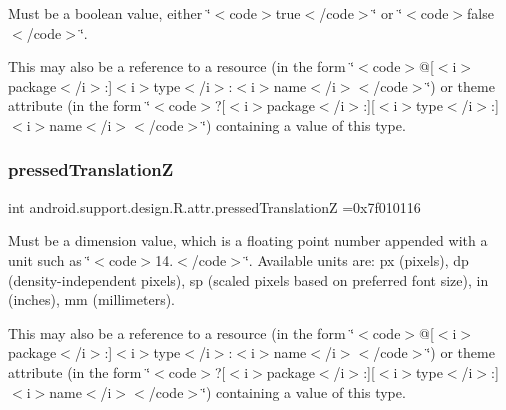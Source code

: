 Must be a boolean value, either \char`\"{}$<$code$>$true$<$/code$>$\char`\"{} or \char`\"{}$<$code$>$false$<$/code$>$\char`\"{}. 

This may also be a reference to a resource (in the form \char`\"{}$<$code$>$@\mbox{[}$<$i$>$package$<$/i$>$\+:\mbox{]}$<$i$>$type$<$/i$>$\+:$<$i$>$name$<$/i$>$$<$/code$>$\char`\"{}) or theme attribute (in the form \char`\"{}$<$code$>$?\mbox{[}$<$i$>$package$<$/i$>$\+:\mbox{]}\mbox{[}$<$i$>$type$<$/i$>$\+:\mbox{]}$<$i$>$name$<$/i$>$$<$/code$>$\char`\"{}) containing a value of this type. \mbox{\label{classandroid_1_1support_1_1design_1_1R_1_1attr_a04a96d87b401abecc5a029d980972cd7}} 
\subsubsection{\texorpdfstring{pressed\+TranslationZ}{pressedTranslationZ}}
{\footnotesize\ttfamily int android.\+support.\+design.\+R.\+attr.\+pressed\+TranslationZ =0x7f010116\hspace{0.3cm}{\ttfamily [static]}}

Must be a dimension value, which is a floating point number appended with a unit such as \char`\"{}$<$code$>$14.\+5sp$<$/code$>$\char`\"{}. Available units are\+: px (pixels), dp (density-\/independent pixels), sp (scaled pixels based on preferred font size), in (inches), mm (millimeters). 

This may also be a reference to a resource (in the form \char`\"{}$<$code$>$@\mbox{[}$<$i$>$package$<$/i$>$\+:\mbox{]}$<$i$>$type$<$/i$>$\+:$<$i$>$name$<$/i$>$$<$/code$>$\char`\"{}) or theme attribute (in the form \char`\"{}$<$code$>$?\mbox{[}$<$i$>$package$<$/i$>$\+:\mbox{]}\mbox{[}$<$i$>$type$<$/i$>$\+:\mbox{]}$<$i$>$name$<$/i$>$$<$/code$>$\char`\"{}) containing a value of this type. \mbox{\label{classandroid_1_1support_1_1design_1_1R_1_1attr_a0ae78413275468b2c80b4a5ec679467c}} 
